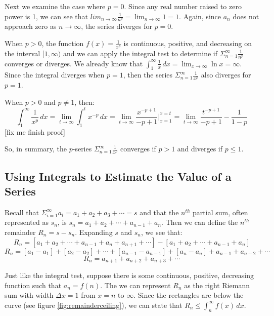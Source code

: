 Next we examine the case where $p=0$. Since any real number raised to zero 
power is 1, we can see that $lim_{n \to \infty} \frac{1}{n^p} = \lim_{n \to 
\infty} 1 = 1$. Again, since $a_n$ does not approach zero as $n \to \infty$, 
the series diverges for $p = 0$. 

When $p > 0$, the function $f(x) = \frac{1}{x^p}$ is continuous, positive, and 
decreasing on the interval $[1, \infty)$ and we can apply the integral test to 
determine if $\Sigma_{n=1}^\infty \frac{1}{n^p}$ converges or diverges. We 
already know that $\int_1^\infty \frac{1}{x}\,dx = \lim_{x \to \infty} \ln{x} 
= \infty$. Since the integral diverges when $p = 1$, then the series $\Sigma_
{n=1}^\infty \frac{1}{x^p}$ also diverges for $p = 1$. 

When $p >0$ and $p \neq 1$, then:
$$\int_1^\infty \frac{1}{x^p}\,dx = \lim_{t \to \infty} \int_1^t x^{-p}\,dx = 
\lim_{t \to \infty} \frac{x^{-p + 1}}{-p + 1}|_{x=1}^{x=t} = \lim_{t \to \infty}
\frac{t^{-p+1}}{-p + 1} - \frac{1}{1-p}$$ [fix me finish proof]

So, in summary, the $p$-series $\Sigma_{n = 1} ^ \infty \frac{1}{x^p}$ converges 
if $p > 1$ and diverges if $p \leq 1$. 

\subsection{Using Integrals to Estimate the Value of a Series}
Recall that $\Sigma_{i=1}^\infty a_i = a_1 + a_2 + a_3 + \cdots = s$ and that 
the $n^{th}$ partial sum, often represented as $s_n$, is $s_n = a_1 + a_2 + 
\cdots + a_{n-1} + a_n$. Then we can define the $n^{th}$ remainder $R_n = s - 
s_n$. Expanding $s$ and $s_n$, we see that:
$$R_n = \left[ a_1 + a_2 + \cdots + a_{n-1} + a_n + a_{n+1} + \cdots \right] - 
\left[ a_1 + a_2 + \cdots + a_{n-1} + a_{n} \right]$$
$$R_n = [a_1 - a_1] + [a_2 - a_2] + \cdots + [a_{n-1} - a_{n-1}] + [a_n - a_n] 
+ a_{n-1} + a_{n-2} + \cdots$$
$$R_n = a_{n+1} + a_{n+2} + a_{n+3} + \cdots$$

Just like the integral test, suppose there is some continuous, positive, 
decreasing function such that $a_n = f(n)$. The we can represent $R_n$ as the 
right Riemann sum with width $\Delta x = 1$ from $x = n$ to $\infty$. Since 
the rectangles are below the curve (see figure \ref{fig:remainderceiling}), we 
can state that $R_n \leq \int_n^\infty f(x)\,dx$.

